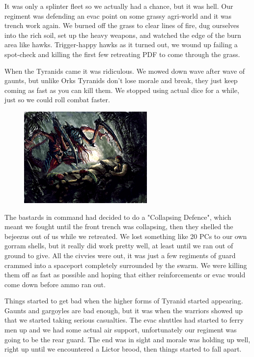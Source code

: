 It was only a splinter fleet so we actually had a chance, but it was hell. 
Our regiment was defending an evac point on some grassy agri-world and it was trench work again. 
We burned off the grass to clear lines of fire, dug ourselves into the rich soil, set up the heavy weapons, and watched the edge of the burn area like hawks.
 Trigger-happy hawks as it turned out, we wound up failing a spot-check and killing the first few retreating PDF to come through the grass. 

When the Tyranids came it was ridiculous. 
We mowed down wave after wave of gaunts, but unlike Orks Tyranids don't lose morale and break, they just keep coming as fast as you can kill them. 
We stopped using actual dice for a while, just so we could roll combat faster.

\begin{figure}
	\begin{center}
		\includegraphics[width=\figwidth]{pics/1/7.png}
	\end{center}
\end{figure}
The bastards in command had decided to do a "Collapsing Defence", which meant we fought until the front trench was collapsing, then they shelled the bejeezus out of us while we retreated. 
We lost something like 20 PCs to our own gorram shells, but it really did work pretty well, at least until we ran out of ground to give. 
All the civvies were out, it was just a few regiments of guard crammed into a spaceport completely surrounded by the swarm.
We were killing them off as fast as possible and hoping that either reinforcements or evac would come down before ammo ran out.

Things started to get bad when the higher forms of Tyranid started appearing. 
Gaunts and gargoyles are bad enough, but it was when the warriors showed up that we started taking serious casualties. 
The evac shuttles had started to ferry men up and we had some actual air support, unfortunately our regiment was going to be the rear guard. 
The end was in sight and morale was holding up well, right up until we encountered a Lictor brood, then things started to fall apart. 

